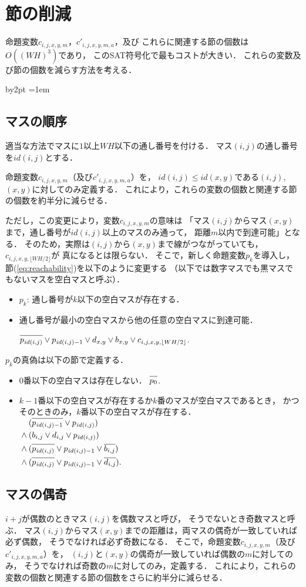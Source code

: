 \documentclass[a4j]{jarticle}
\newcommand{\N}[1]{\overline{#1\vphantom{l}}}
\newcommand{\←}{{\leftarrow}}
\newcommand{\→}{{\rightarrow}}
\newcommand{\↑}{{\uparrow}}
\newcommand{\↓}{{\downarrow}}
\begin{document}
\section{節の削減}

命題変数$c_{i,j,x,y,m}$，$c'_{i,j,x,y,m,a}$，及び
これらに関連する節の個数は$O((WH)^3)$であり，
このSAT符号化で最もコストが大きい．
これらの変数及び節の個数を減らす方法を考える．

\newcommand{\id}{\mathit{id}}
\advance\parskip by2pt
\parindent=1em

\subsection{マスの順序}

適当な方法でマスに$1$以上$WH$以下の通し番号を付ける．
マス$(i,j)$の通し番号を$\id(i,j)$とする．

命題変数$c_{i,j,x,y,m}$（及び$c'_{i,j,x,y,m,a}$）を，
$\id(i,j)\le\id(x,y)$である$(i,j)$, $(x,y)$に対してのみ定義する．
これにより，これらの変数の個数と関連する節の個数を約半分に減らせる．

ただし，この変更により，変数$c_{i,j,x,y,m}$の意味は
「マス$(i,j)$からマス$(x,y)$まで，通し番号が$\id(i,j)$以上のマスのみ通って，
距離$m$以内で到達可能」となる．
そのため，実際は$(i,j)$から$(x,y)$まで線がつながっていても，
$c_{i,j,x,y,\lfloor WH/2\rfloor}$が
真になるとは限らない．
そこで，新しく命題変数$p_k$を導入し，
節(\ref{eq:reachability})を以下のように変更する
（以下では数字マスでも黒マスでもないマスを空白マスと呼ぶ）．
\begin{itemize}
\item $p_k$: 通し番号が$k$以下の空白マスが存在する．
\item 通し番号が最小の空白マスから他の任意の空白マスに到達可能．
  \par\qquad
  $\N{p_{\id(i,j)}}\lor{p_{\id(i,j)-1}}\lor
   d_{x,y}\lor b_{x,y}\lor
   c_{i,j,x,y,\lfloor WH/2\rfloor}$.
\end{itemize}
%
$p_k$の真偽は以下の節で定義する．
\begin{itemize}
\item $0$番以下の空白マスは存在しない．
  $\N{p_0}$.
\item $k-1$番以下の空白マスが存在するか$k$番のマスが空白マスであるとき，
  かつそのときのみ，$k$番以下の空白マスが存在する．
  $\begin{aligned}[t]
   &(\N{p_{\id(i,j)-1}}\lor p_{\id(i,j)}) \\ {}\land{}
   &(b_{i,j}\lor d_{i,j}\lor p_{\id(i,j)}) \\ {}\land{}
   &(\N{p_{\id(i,j)}}\lor p_{\id(i,j)-1}\lor \N{b_{i,j}}) \\ {}\land{}
   &(\N{p_{\id(i,j)}}\lor p_{\id(i,j)-1}\lor \N{d_{i,j}}).
   \end{aligned}$
\end{itemize}

\subsection{マスの偶奇}
$i+j$が偶数のときマス$(i,j)$を偶数マスと呼び，
そうでないとき奇数マスと呼ぶ．
マス$(i,j)$からマス$(x,y)$までの距離は，両マスの偶奇が一致していれば必ず偶数，
そうでなければ必ず奇数になる．
そこで，命題変数$c_{i,j,x,y,m}$（及び$c'_{i,j,x,y,m,a}$）を，
$(i,j)$と$(x,y)$の偶奇が一致していれば偶数の$m$に対してのみ，
そうでなければ奇数の$m$に対してのみ，定義する．
これにより，これらの変数の個数と関連する節の個数をさらに約半分に減らせる．
\end{document}

